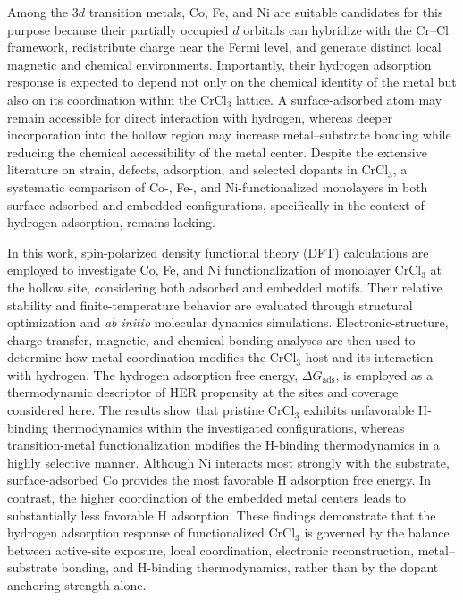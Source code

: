 \documentclass[journal=jacsat,manuscript=article]{achemso}
\begin{document}
Among the $3d$ transition metals, Co, Fe, and Ni are suitable candidates for this purpose because their partially occupied $d$ orbitals can hybridize with the Cr--Cl framework, redistribute charge near the Fermi level, and generate distinct local magnetic and chemical environments. Importantly, their hydrogen adsorption response is expected to depend not only on the chemical identity of the metal but also on its coordination within the CrCl$_3$ lattice. A surface-adsorbed atom may remain accessible for direct interaction with hydrogen, whereas deeper incorporation into the hollow region may increase metal--substrate bonding while reducing the chemical accessibility of the metal center. Despite the extensive literature on strain, defects, adsorption, and selected dopants in CrCl$_3$, a systematic comparison of Co-, Fe-, and Ni-functionalized monolayers in both surface-adsorbed and embedded configurations, specifically in the context of hydrogen adsorption, remains lacking.

In this work, spin-polarized density functional theory (DFT) calculations are employed to investigate Co, Fe, and Ni functionalization of monolayer CrCl$_3$ at the hollow site, considering both adsorbed and embedded motifs. Their relative stability and finite-temperature behavior are evaluated through structural optimization and \textit{ab initio} molecular dynamics simulations. Electronic-structure, charge-transfer, magnetic, and chemical-bonding analyses are then used to determine how metal coordination modifies the CrCl$_3$ host and its interaction with hydrogen. The hydrogen adsorption free energy, $\Delta G_{\mathrm{ads}}$, is employed as a thermodynamic descriptor of HER propensity at the sites and coverage considered here. The results show that pristine CrCl$_3$ exhibits unfavorable H-binding thermodynamics within the investigated configurations, whereas transition-metal functionalization modifies the H-binding thermodynamics in a highly selective manner. Although Ni interacts most strongly with the substrate, surface-adsorbed Co provides the most favorable H adsorption free energy. In contrast, the higher coordination of the embedded metal centers leads to substantially less favorable H adsorption. These findings demonstrate that the hydrogen adsorption response of functionalized CrCl$_3$ is governed by the balance between active-site exposure, local coordination, electronic reconstruction, metal--substrate bonding, and H-binding thermodynamics, rather than by the dopant anchoring strength alone.
\end{document}
